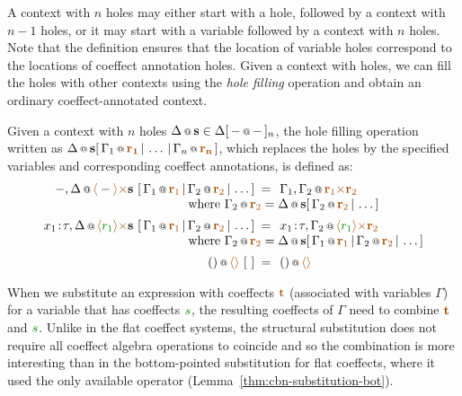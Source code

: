 \noindent
A context with $n$ holes may either start with a hole, followed by a context with $n-1$ holes, or it may
start with a variable followed by a context with $n$ holes. Note that the definition ensures that
the location of variable holes correspond to the locations of coeffect annotation holes. Given a context
with holes, we can fill the holes with other contexts using the \emph{hole filling} operation and
obtain an ordinary coeffect-annotated context.

\begin{definition} Given a context with $n$ holes $\coctx{\Delta}{\textbf{s}} \in 
\Delta[\,\coctx{-}{-}\,]_n$, the hole filling operation written as 
$\coctx{\Delta}{\textbf{s}}[\,\coctx{\Gamma_1}{\aclrd{\mathbf{r_1}}} \,|\, \ldots \,|\, \coctx{\Gamma_n}{\aclrd{\mathbf{r_n}}} \,]$,
which replaces the holes by the specified variables and corresponding coeffect annotations, is defined as:
%
\begin{equation*}
\begin{array}{rcl}
 \coctx{-, \Delta}{\alift{-} \atimes \textbf{s} }
    ~[\,\coctx{\Gamma_1}{\aclrd{\textbf{r}_1}} \,|\, \coctx{\Gamma_2}{\aclrd{\textbf{r}_2}} \,|\, \ldots \,] &\narrow{=}&
      \coctx{\Gamma_1, \Gamma_2}{\aclrd{\textbf{r}_1} \atimes \aclrd{\textbf{r}_2} } \\
 && \qquad \hspace{-9.3em} \textnormal{where}~\coctx{\Gamma_2}{\aclrd{\textbf{r}_2}} =
     \coctx{\Delta}{\textbf{s}}[\, \coctx{\Gamma_2}{\aclrd{\textbf{r}_2}} \,|\, \ldots \,] 
\\[0.5em]
 \coctx{x_1\!:\!\tau, \Delta}{\alift{\cclrd{r_1}} \atimes \textbf{s} }
    ~[\,\coctx{\Gamma_1}{\aclrd{\textbf{r}_1}} \,|\, \coctx{\Gamma_2}{\aclrd{\textbf{r}_2}} \,|\, \ldots \,] &\narrow{=}&
      \coctx{x_1\!:\!\tau, \Gamma_2}{\alift{\cclrd{r_1}} \atimes \aclrd{\textbf{r}_2} } \\
 && \qquad \hspace{-9.3em} \textnormal{where}~\coctx{\Gamma_2}{\aclrd{\textbf{r}_2}} =
     \coctx{\Delta}{\textbf{s}}[\,\coctx{\Gamma_1}{\aclrd{\textbf{r}_1}} \,|\, \coctx{\Gamma_2}{\aclrd{\textbf{r}_2}} \,|\, \ldots \,] 
\\[0.5em]
 \coctx{()}{\alift{}}~[~] &\narrow{=}& \coctx{()}{\alift{}}
\end{array} 
\end{equation*} 
\end{definition}

\noindent
When we substitute an expression with coeffects $\aclrd{\textbf{t}}$ (associated with variables $\Gamma$)
for a variable that has coeffects $\cclrd{s}$, the resulting coeffects of $\Gamma$ need to 
combine $\aclrd{\textbf{t}}$ and $\cclrd{s}$. Unlike in the flat coeffect systems, the structural 
substitution does not require all coeffect algebra operations to coincide and so the combination
is more interesting than in the bottom-pointed substitution for flat coeffects, where it used
the only available operator (Lemma~\ref{thm:cbn-substitution-bot}).

